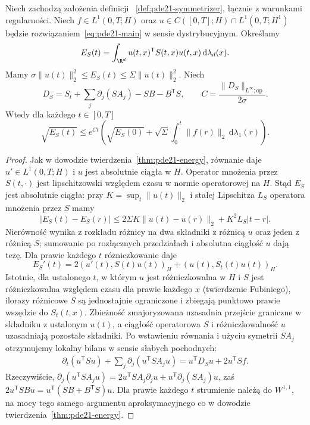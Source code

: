 \begin{twierdzenie}
\label{thm:pde21-symmetrizer}
Niech zachodzą założenia definicji
~\ref{def:pde21-symmetrizer}, łącznie z warunkami
regularności. Niech $f\in L^1(0,T;H)$ oraz
$u\in C([0,T];H)\cap L^1(0,T;H^1)$ będzie
rozwiązaniem~\eqref{eq:pde21-main} w sensie
dystrybucyjnym. Określamy
\[
 E_S(t)=\int_{\R^d}u(t,x)^\mathsf TS(t,x)u(t,x)
 \,\mathrm d\lambda_d(x).
\]
Mamy $\sigma\|u(t)\|_2^2\le E_S(t)\le
\Sigma\|u(t)\|_2^2$.
Niech
\[
 D_S=S_t+\sum_j\partial_j(SA_j)-SB-B^\mathsf TS,
 \qquad C=\frac{\|D_S\|_{L^\infty;\mathrm{op}}}{2\sigma}.
\]
Wtedy dla każdego $t\in[0,T]$
\[
 \sqrt{E_S(t)}\le e^{Ct}\left(\sqrt{E_S(0)}+
 \sqrt\Sigma\int_0^t\|f(r)\|_2\,\mathrm d\lambda_1(r)\right).
\]
\end{twierdzenie}
\begin{proof}
Jak w dowodzie twierdzenia~\ref{thm:pde21-energy},
równanie daje $u'\in L^1(0,T;H)$ i $u$ jest absolutnie
ciągła w $H$. Operator mnożenia przez $S(t,\cdot)$
jest lipschitzowski względem czasu w normie
operatorowej na $H$. Stąd $E_S$ jest absolutnie
ciągła: przy $K=\sup_t\|u(t)\|_2$ i stałej
Lipschitza $L_S$ operatora mnożenia przez $S$
mamy
\[
 |E_S(t)-E_S(r)|
 \le 2\Sigma K\|u(t)-u(r)\|_2+K^2L_S|t-r|.
\]
Nierówność wynika z rozkładu różnicy na dwa
składniki z różnicą $u$ oraz jeden z różnicą $S$;
sumowanie po rozłącznych przedziałach i absolutna
ciągłość $u$ dają tezę.
Dla prawie każdego $t$ różniczkowanie daje
\[
 E_S'(t)=2(u'(t),S(t)u(t))_H+
          (u(t),S_t(t)u(t))_H.
\]
Istotnie, dla ustalonego $t$, w którym $u$ jest
różniczkowalna w $H$ i $S$ jest różniczkowalna
względem czasu dla prawie każdego $x$ (twierdzenie
Fubiniego), ilorazy różnicowe $S$ są jednostajnie
ograniczone i zbiegają punktowo prawie wszędzie
do $S_t(t,x)$. Zbieżność zmajoryzowana uzasadnia
przejście graniczne w składniku z ustalonym $u(t)$,
a ciągłość operatorowa $S$ i różniczkowalność $u$
uzasadniają pozostałe składniki.
Po wstawieniu równania i użyciu symetrii $SA_j$
otrzymujemy lokalny bilans w sensie słabych pochodnych:
\[
 \begin{split}
 \partial_t(u^\mathsf TS u)+\sum_j\partial_j(u^\mathsf TSA_ju)
 =u^\mathsf TD_Su+2u^\mathsf TSf.
 \end{split}
\]
Rzeczywiście,
$\partial_j(u^\mathsf TSA_ju)=
2u^\mathsf TSA_j\partial_ju+
u^\mathsf T\partial_j(SA_j)u$, zaś
$2u^\mathsf TSBu=u^\mathsf T(SB+B^\mathsf TS)u$.
Dla prawie każdego $t$ strumienie należą do $W^{1,1}$,
na mocy tego samego argumentu aproksymacyjnego
co w dowodzie twierdzenia~\ref{thm:pde21-energy}.

\end{proof}
